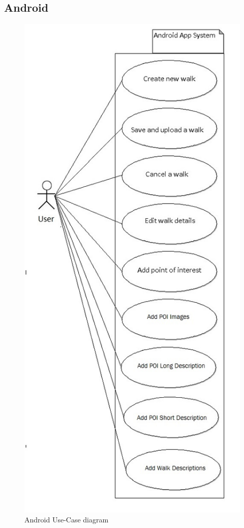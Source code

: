 \documentclass[12pt]{article}
\begin{document}
\subsection{Android}
\begin{figure}[htp]
\centering
\includegraphics[scale=0.50]{Project_Plan/docs/Android_use_case_final.jpg}
\caption{Android Use-Case diagram}
\label{Android Use-Case Diagram}
\end{figure}
\newpage
\end{document}
